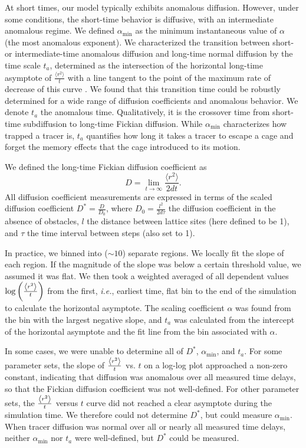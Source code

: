 At short times, our model typically exhibits anomalous diffusion. However, under
some conditions, the short-time behavior is diffusive, with an intermediate
anomalous regime.  We defined $\alpha_{\min}$ as the minimum instantaneous value
of $\alpha$ (the most anomalous exponent).  We characterized the transition
between short- or intermediate-time anomalous diffusion and long-time normal
diffusion by the time scale $t_a$, determined as the intersection of the
horizontal long-time asymptote of $ \frac{ \langle r^2 \rangle } { t } $  with a
line tangent to the point of the maximum rate of decrease of this curve
.  We found that this transition time could be
robustly determined for a wide range of diffusion coefficients and anomalous
behavior. We denote $t_{a}$ the anomalous time. Qualitatively, it is the
crossover time from short-time subdiffusion to long-time Fickian diffusion.
While $\alpha_{\min}$ characterizes how trapped a tracer is, $t_{a}$ quantifies
how long it takes a tracer to escape a cage and forget the memory effects that
the cage introduced to its motion.  

We defined the long-time Fickian diffusion coefficient as
%
\begin{equation}
  \label{diff}
  D = \lim_{t \to \infty} \frac{\langle r^2 \rangle} {2d t}.
\end{equation}
%
All diffusion coefficient measurements are expressed in terms of the scaled
diffusion coefficient $ D^* = \frac{ D } {D_0} $, where $ D_0 = \frac{ l^2 }{ 2
  d \tau} $ the diffusion coefficient in the absence of obstacles, $l$ the
distance between lattice sites (here defined to be 1), and $\tau$ the time
interval between steps (also set to 1).

In practice, we binned  into ($\sim 10$) separate regions.
We locally fit the slope of each region.  If the magnitude of the slope was
below a certain threshold value, we assumed it was flat.  We then took a
weighted averaged of all dependent values
$\log{\left(\frac{\ensuremath{\left\langle r^2 \right\rangle}}{t}\right)}$ from the first, \textit{i.e.}, earliest
time, flat bin to the end of the simulation to calculate the horizontal
asymptote. The scaling coefficient $\alpha$ was found from the bin with the
largest negative slope, and $t_a$ was calculated from the intercept of the
horizontal asymptote and the fit line from the bin associated with $\alpha$.

In some cases, we were unable to determine all of $D^*$, $\alpha_{\min}$, and
$t_a$. For some parameter sets, the slope of $\frac{\left\langle r^2 \right\rangle}{t}$ vs.  $ t $ on
a log-log plot approached a non-zero constant, indicating that diffusion was
anomalous over all measured time delays, so that the Fickian diffusion
coefficient was not well-defined. For other parameter sets, the
$\frac{\left\langle r^2 \right\rangle}{t}$ versus $ t $ curve did not reached a clear asymptote during
the simulation time. We therefore could not determine $D^*$, but could measure
$\alpha_{\min}$.  When tracer diffusion was normal over all or nearly all
measured time delays, neither $\alpha_{\min}$ nor $t_a$ were well-defined, but
$D^*$ could be measured.


